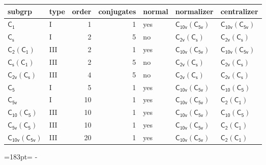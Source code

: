 \documentclass[10pt,a4paper]{article}
\newcommand{\needspace}[1]{\par\penalty-100\begingroup\dimen0=#1\relax\dimen2=\pagegoal
  \advance\dimen2-\pagetotal\ifdim\dimen0>\dimen2\relax\ifdim\dimen2>0pt\vfil\break\fi\fi
  \endgroup}
\numberwithin{equation}{section}
\newcommand{\grp}[1]{\mathsf{#1}}
\begin{document}
{\small\begin{longtable}{@{}llrrlll@{}}\toprule
subgrp & type & order & conjugates & normal & normalizer & centralizer\\\midrule\endhead
\bottomrule\endfoot\endlastfoot
\href{../../../rotation/data/pdf/C1.pdf}{$\grp{C_{1}}$} & I & 1 & 1 & yes & \href{C10v-C5v.pdf}{$\grp{C_{10v}}(\grp{C_{5v}})$} & \href{C10v-C5v.pdf}{$\grp{C_{10v}}(\grp{C_{5v}})$}\\*
\href{../../../rotation/data/pdf/C1v.pdf}{$\grp{C_{s}}$} & I & 2 & 5 & no & \href{C2v-C1v.pdf}{$\grp{C_{2v}}(\grp{C_{s}})$} & \href{C2v-C1v.pdf}{$\grp{C_{2v}}(\grp{C_{s}})$}\\*
\href{C2-C1.pdf}{$\grp{C_{2}}(\grp{C_{1}})$} & III & 2 & 1 & yes & \href{C10v-C5v.pdf}{$\grp{C_{10v}}(\grp{C_{5v}})$} & \href{C10v-C5v.pdf}{$\grp{C_{10v}}(\grp{C_{5v}})$}\\*
\href{C1v-C1.pdf}{$\grp{C_{s}}(\grp{C_{1}})$} & III & 2 & 5 & no & \href{C2v-C1v.pdf}{$\grp{C_{2v}}(\grp{C_{s}})$} & \href{C2v-C1v.pdf}{$\grp{C_{2v}}(\grp{C_{s}})$}\\*
\href{C2v-C1v.pdf}{$\grp{C_{2v}}(\grp{C_{s}})$} & III & 4 & 5 & no & \href{C2v-C1v.pdf}{$\grp{C_{2v}}(\grp{C_{s}})$} & \href{C2v-C1v.pdf}{$\grp{C_{2v}}(\grp{C_{s}})$}\\*
\href{../../../rotation/data/pdf/C5.pdf}{$\grp{C_{5}}$} & I & 5 & 1 & yes & \href{C10v-C5v.pdf}{$\grp{C_{10v}}(\grp{C_{5v}})$} & \href{C10-C5.pdf}{$\grp{C_{10}}(\grp{C_{5}})$}\\*
\href{../../../rotation/data/pdf/C5v.pdf}{$\grp{C_{5v}}$} & I & 10 & 1 & yes & \href{C10v-C5v.pdf}{$\grp{C_{10v}}(\grp{C_{5v}})$} & \href{C2-C1.pdf}{$\grp{C_{2}}(\grp{C_{1}})$}\\*
\href{C10-C5.pdf}{$\grp{C_{10}}(\grp{C_{5}})$} & III & 10 & 1 & yes & \href{C10v-C5v.pdf}{$\grp{C_{10v}}(\grp{C_{5v}})$} & \href{C10-C5.pdf}{$\grp{C_{10}}(\grp{C_{5}})$}\\*
\href{C5v-C5.pdf}{$\grp{C_{5v}}(\grp{C_{5}})$} & III & 10 & 1 & yes & \href{C10v-C5v.pdf}{$\grp{C_{10v}}(\grp{C_{5v}})$} & \href{C2-C1.pdf}{$\grp{C_{2}}(\grp{C_{1}})$}\\*
\href{C10v-C5v.pdf}{$\grp{C_{10v}}(\grp{C_{5v}})$} & III & 20 & 1 & yes & \href{C10v-C5v.pdf}{$\grp{C_{10v}}(\grp{C_{5v}})$} & \href{C2-C1.pdf}{$\grp{C_{2}}(\grp{C_{1}})$}\\
\bottomrule\end{longtable}}
\needspace{183pt}
\end{document}
